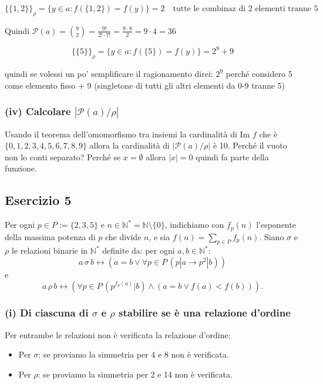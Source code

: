 $$\{\{1,2\}\}_\rho = \{y \in a : f(\{1,2\}) = f(y)\} = 2 \quad \text{tutte le combinaz di 2 elementi tranne 5}$$

Quindi $\mathcal{P}(a) = \binom{9}{2} = \frac{9!}{2! \cdot 7!} = \frac{9 \cdot 8}{2} = 9 \cdot 4 = 36$

$$\{\{5\}\}_\rho = \{y \in a : f(\{5\}) = f(y)\} = 2^9 + 9$$

quindi se volessi un po' semplificare il ragionamento direi: $2^9$ perché considero 5 come elemento fisso + 9 (singletone di tutti gli altri elementi da 0-9 tranne 5)

\subsubsection*{(iv) Calcolare $|\mathcal{P}(a)/\rho|$}

Usando il teorema dell'omomorfismo tra insiemi la cardinalità di Im $f$ che è $\{0, 1, 2, 3, 4, 5, 6, 7, 8, 9\}$ allora la cardinalità di $|\mathcal{P}(a)/\rho|$ è 10. Perché il vuoto non lo conti separato? Perché se $x = \emptyset$ allora $|x| = 0$ quindi fa parte della funzione.

\subsection*{Esercizio 5}

Per ogni $p \in P := \{2,3,5\}$ e $n \in \mathbb{N}^* = \mathbb{N} \setminus \{0\}$, indichiamo con $f_p(n)$ l'esponente della massima potenza di $p$ che divide $n$, e sia $f(n) = \sum_{p \in P} f_p(n)$. Siano $\sigma$ e $\rho$ le relazioni binarie in $\mathbb{N}^*$ definite da: per ogni $a, b \in \mathbb{N}^*$:
$$a \,\sigma\, b \leftrightarrow (a = b \lor \forall p \in P\, (p|a \to p^2|b))$$
e
$$a \,\rho\, b \leftrightarrow (\forall p \in P\, (p^{f_p(a)}|b) \land (a = b \lor f(a) < f(b))).$$

\subsubsection*{(i) Di ciascuna di $\sigma$ e $\rho$ stabilire se è una relazione d'ordine}

Per entrambe le relazioni non è verificata la relazione d'ordine:

\begin{itemize}
    \item Per $\sigma$: se proviamo la simmetria per 4 e 8 non è verificata.
    
    \item Per $\rho$: se proviamo la simmetria per 2 e 14 non è verificata.
\end{itemize}

